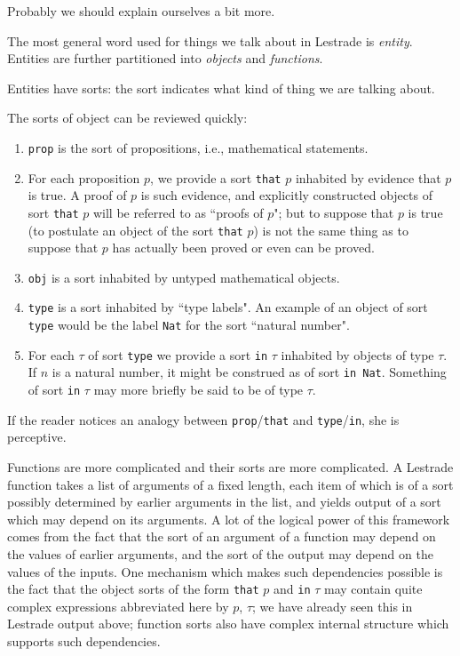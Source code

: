\documentclass[12pt]{article}
\begin{document}
Probably we should explain ourselves a bit more.

The most general word used for things we talk about in Lestrade is {\em entity\/}.  Entities are further partitioned into {\em objects} and {\em functions}.

Entities have sorts:  the sort indicates what kind of thing we are talking about.  

The sorts of object can be reviewed quickly:

\begin{enumerate}

\item {\tt prop} is the sort of propositions, i.e., mathematical statements.

\item For each proposition $p$, we provide a sort {\tt that} $p$ inhabited by evidence that $p$ is true.  A proof of $p$ is such evidence, and explicitly constructed objects of sort {\tt that} $p$ will be referred to as ``proofs of $p$";  but to suppose that $p$ is true (to postulate an object of the sort {\tt that} $p$) is not the same thing as to suppose that $p$ has actually been proved or even can be proved.

\item {\tt obj} is a sort inhabited by untyped mathematical objects.

\item {\tt type} is a sort inhabited by ``type labels".  An example of an object of sort {\tt type} would be the label {\tt Nat} for the sort ``natural number".

\item For each $\tau$ of sort {\tt type} we provide a sort {\tt in} $\tau$ inhabited by objects of type $\tau$.  If $n$ is a natural number, it might be construed as of sort {\tt in Nat}.  Something of sort {\tt in} $\tau$ may more briefly be said to be of type $\tau$.

\end{enumerate}

If the reader notices an analogy between {\tt prop}/{\tt that} and {\tt type}/{\tt in}, she is perceptive.

Functions are more complicated and their sorts are more complicated.  A Lestrade function takes a list of arguments of a fixed length, each item of which is of a sort possibly determined by earlier arguments in the list, and yields output of a sort which may depend on its arguments.  A lot of the logical power of this framework comes from the fact that the sort of an argument of a function may depend on the values of earlier arguments, and the sort of the output may depend on the values of the inputs.  One mechanism which makes such dependencies possible is the fact that the object sorts of the form {\tt that} $p$ and {\tt in} $\tau$ may contain quite complex expressions abbreviated here by $p$, $\tau$;  we have already seen this in Lestrade output above;  function sorts also have complex internal structure which supports such dependencies.
\end{document}
